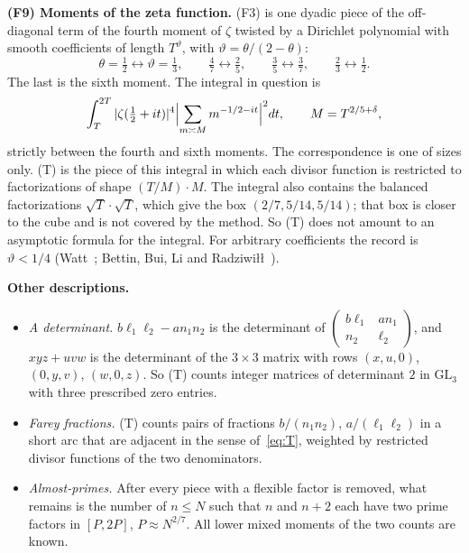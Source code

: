 \documentclass[11pt]{amsart}
\theoremstyle{definition}
\theoremstyle{remark}
\numberwithin{equation}{section}
\begin{document}
\medskip
\noindent\textbf{(F9) Moments of the zeta function.}  (F3) is one dyadic
piece of the off-diagonal term of the fourth moment of $\zeta$ twisted by a
Dirichlet polynomial with smooth coefficients of length $T^{\vartheta}$,
with $\vartheta=\theta/(2-\theta)$:
\[
 \theta=\tfrac12\leftrightarrow\vartheta=\tfrac13,\qquad
 \tfrac47\leftrightarrow\tfrac25,\qquad
 \tfrac35\leftrightarrow\tfrac37,\qquad
 \tfrac23\leftrightarrow\tfrac12 .
\]
The last is the sixth moment.  The integral in question is
\[
 \int_T^{2T}|\zeta(\tfrac12+it)|^4\Bigl|\sum_{m\asymp M}m^{-1/2-it}\Bigr|^2dt,
 \qquad M=T^{2/5+\delta},
\]
strictly between the fourth and sixth moments.  The correspondence is one
of sizes only.  (T) is the piece of this integral in which each divisor
function is restricted to factorizations of shape $(T/M)\cdot M$.  The
integral also contains the balanced factorizations
$\sqrt T\cdot\sqrt T$, which give the box $(2/7,5/14,5/14)$; that box is
closer to the cube and is not covered by the method.  So (T) does not
amount to an asymptotic formula for the integral.  For arbitrary
coefficients the record is $\vartheta<1/4$ (Watt~\cite{Watt};
Bettin, Bui, Li and Radziwi\l\l~\cite{BBLR}).

\medskip
\noindent\textbf{Other descriptions.}
\begin{itemize}
\item \emph{A determinant.}  $b\ell_1\ell_2-an_1n_2$ is the determinant of
$\left(\begin{smallmatrix}b\ell_1&an_1\\ n_2&\ell_2\end{smallmatrix}\right)$,
and $xyz+uvw$ is the determinant of the $3\times3$ matrix with rows
$(x,u,0)$, $(0,y,v)$, $(w,0,z)$.  So (T) counts integer matrices of
determinant $2$ in $\mathrm{GL}_3$ with three prescribed zero entries.
\item \emph{Farey fractions.}  (T) counts pairs of fractions
$b/(n_1n_2)$, $a/(\ell_1\ell_2)$ in a short arc that are adjacent in the
sense of~\eqref{eq:T}, weighted by restricted divisor functions of the two
denominators.
\item \emph{Almost-primes.}  After every piece with a flexible factor is
removed, what remains is the number of $n\le N$ such that $n$ and $n+2$ each
have two prime factors in $[P,2P]$, $P\approx N^{2/7}$.  All lower mixed
moments of the two counts are known.
\end{itemize}
\end{document}
